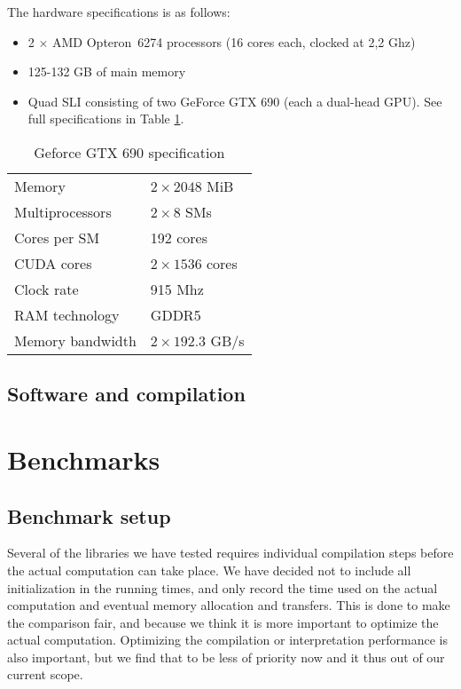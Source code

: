 The hardware specifications is as follows:

\begin{itemize}
\item 2 $\times$ AMD Opteron\texttrademark\ 6274 processors (16 cores each, clocked at 2,2 Ghz)
\item 125-132 GB of main memory 
\item Quad SLI consisting of two GeForce GTX 690 (each a dual-head GPU). See full specifications in Table \ref{tab:hardware}.
\end{itemize}

\begin{table}
  \centering
  \begin{tabular}{ll}
    Memory & $2 \times 2048$ MiB \\
    Multiprocessors & $2 \times 8$ SMs\\
    Cores per SM & 192 cores \\
    CUDA cores & $2 \times 1536$ cores\\
    Clock rate & 915 Mhz \\
    RAM technology & GDDR5 \\
    Memory bandwidth & $2 \times 192.3$ GB/s \\
    \hline
  \end{tabular}
  \caption{Geforce GTX 690 specification}
  \label{tab:hardware}
\end{table}


\subsection{Software and compilation}


\section{Benchmarks}
\subsection{Benchmark setup}
Several of the libraries we have tested requires individual
compilation steps before the actual computation can take place. We
have decided not to include all initialization in the running times,
and only record the time used on the actual computation and eventual
memory allocation and transfers. This is done to make the comparison
fair, and because we think it is more important to optimize the actual
computation. Optimizing the compilation or interpretation performance
is also important, but we find that to be less of priority now and it
thus out of our current scope.

